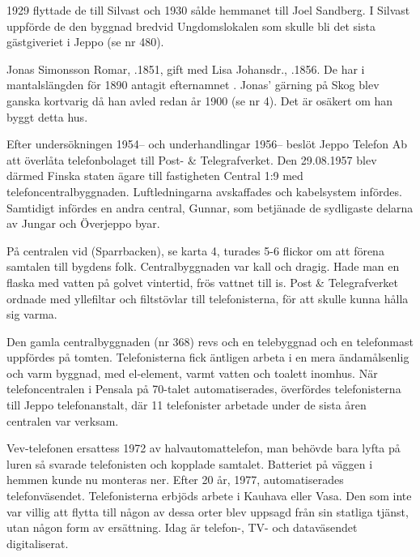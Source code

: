 1929 flyttade de till Silvast och 1930 sålde hemmanet till Joel Sandberg. I Silvast uppförde de den byggnad bredvid Ungdomslokalen som skulle bli det sista gästgiveriet i Jeppo (se nr 480).


Jonas Simonsson Romar, .1851, gift med Lisa Johansdr., .1856. De har i mantalslängden för 1890 antagit efternamnet . Jonas' gärning på Skog blev ganska kortvarig då han avled redan år 1900 (se nr 4). Det är osäkert om han byggt detta hus.






Efter undersökningen 1954-- och underhandlingar 1956-- beslöt	Jeppo Telefon Ab att överlåta telefonbolaget till Post- \& Telegrafverket. Den 29.08.1957 blev därmed Finska staten ägare till fastigheten Central 1:9 med telefoncentralbyggnaden. Luftledningarna avskaffades och kabelsystem infördes. Samtidigt infördes en andra central, Gunnar, som betjänade de sydligaste delarna av Jungar och Överjeppo byar.

På centralen vid  (Sparrbacken), se karta 4, turades 5-6 flickor om att förena samtalen till bygdens folk. Centralbyggnaden var kall och dragig. Hade man en flaska med vatten på golvet vintertid, frös vattnet till is. Post \& Telegrafverket ordnade med yllefiltar och filtstövlar till telefonisterna, för att skulle kunna hålla sig varma.

Den gamla centralbyggnaden (nr 368) revs och en telebyggnad och en telefonmast uppfördes på tomten. Telefonisterna fick äntligen arbeta i en mera ändamålsenlig och varm byggnad, med el-element, varmt vatten och toalett inomhus. När telefoncentralen i Pensala på 70-talet automatiserades, överfördes telefonisterna till Jeppo telefonanstalt, där 11 telefonister arbetade under de sista åren centralen var verksam.

Vev-telefonen ersattess 1972 av halvautomattelefon, man behövde bara lyfta på luren så svarade telefonisten och kopplade samtalet. Batteriet på väggen i hemmen kunde nu monteras ner. Efter 20 år, 1977, automatiserades telefonväsendet. Telefonisterna erbjöds arbete i Kauhava eller Vasa. Den som inte var villig att flytta till någon av dessa orter blev uppsagd från sin statliga tjänst, utan någon form av ersättning. Idag är telefon-, TV- och dataväsendet digitaliserat.


